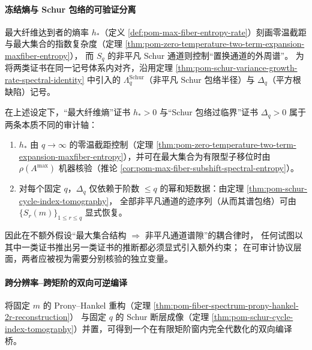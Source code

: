 \paragraph{冻结熵与 Schur 包络的可验证分离}
最大纤维达到者的熵率 \(h_\ast\)（定义 \ref{def:pom-max-fiber-entropy-rate}）刻画零温截距与最大集合的指数复杂度（定理 \ref{thm:pom-zero-temperature-two-term-expansion-maxfiber-entropy}），
而 \(S_q\) 的非平凡 Schur 通道则控制“置换通道的外周谱”。
为将两类证书在同一记号体系内对齐，沿用定理 \ref{thm:pom-schur-variance-growth-rate-spectral-identity} 中引入的
\(\Lambda_q^{\mathrm{Schur}}\)（非平凡 Schur 包络半径）与 \(\Delta_q\)（平方根缺陷）记号。

\begin{proposition}\label{prop:pom-freezing-vs-schur-envelope-separation}
在上述设定下，“最大纤维熵”证书 \(h_\ast>0\) 与“Schur 包络过临界”证书 \(\Delta_q>0\) 属于两条本质不同的审计轴：
\begin{enumerate}
  \item \(h_\ast\) 由 \(q\to\infty\) 的零温截距控制（定理 \ref{thm:pom-zero-temperature-two-term-expansion-maxfiber-entropy}），并可在最大集合为有限型子移位时由 \(\rho(A^{\max})\) 机器核验（推论 \ref{cor:pom-max-fiber-subshift-spectral-entropy}）。
  \item 对每个固定 \(q\)，\(\Delta_q\) 仅依赖于阶数 \(\le q\) 的幂和矩数据：由定理 \ref{thm:pom-schur-cycle-index-tomography}，
  全部非平凡通道的迹序列（从而其谱包络）可由 \(\{S_r(m)\}_{1\le r\le q}\) 显式恢复。
\end{enumerate}
因此在不额外假设“最大集合结构 \(\Rightarrow\) 非平凡通道谱隙”的耦合律时，
任何试图以其中一类证书推出另一类证书的推断都必须显式引入额外约束；
在可审计协议层面，两者应被视为需要分别核验的独立变量。
\end{proposition}

\paragraph{跨分辨率--跨矩阶的双向可逆编译}
将固定 \(m\) 的 Prony--Hankel 重构（定理 \ref{thm:pom-fiber-spectrum-prony-hankel-2r-reconstruction}）
与固定 \(q\) 的 Schur 断层成像（定理 \ref{thm:pom-schur-cycle-index-tomography}）并置，可得到一个在有限矩阶窗内完全代数化的双向编译桥。

